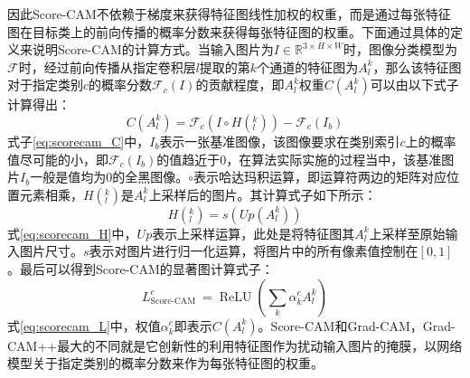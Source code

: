 因此Score-CAM不依赖于梯度来获得特征图线性加权的权重，而是通过每张特征图在目标类上的前向传播的概率分数来获得每张特征图的权重。下面通过具体的定义来说明Score-CAM的计算方式。当输入图片为$I \in \mathbb{R}^{3\times H \times W}$时，图像分类模型为$\mathcal{F}$时，经过前向传播从指定卷积层$l$提取的第$k$个通道的特征图为$A^k_l$，那么该特征图对于指定类别$c$的概率分数$\mathcal{F}_c(I)$的贡献程度，即$A^k_l$权重$C(A^k_l)$可以由以下式子计算得出：
\begin{equation}
	C(A^k_l)=\mathcal{F}_c(I \circ H(^k_l))-\mathcal{F}_c(I_b)
	\label{eq:scorecam_C}
\end{equation}
式子\ref{eq:scorecam_C}中，$I_b$表示一张基准图像，该图像要求在类别索引$c$上的概率值尽可能的小，即$\mathcal{F}_c(I_b)$的值趋近于0，在算法实际实施的过程当中，该基准图片$I_b$一般是值均为0的全黑图像。$\circ$表示哈达玛积运算，即运算符两边的矩阵对应位置元素相乘，$H(^k_l)$是$A^k_l$上采样后的图片。其计算式子如下所示：
\begin{equation}
	H(^k_l)=s(U\!p(A^k_l))
	\label{eq:scorecam_H}
\end{equation}
式\ref{eq:scorecam_H}中，$U\!p$表示上采样运算，此处是将特征图其$A^k_l$上采样至原始输入图片尺寸。$s$表示对图片进行归一化运算，将图片中的所有像素值控制在$[0,1]$。最后可以得到Score-CAM的显著图计算式子：
\begin{equation}
	L_{\text {Score-CAM }}^{c}=\operatorname{ReLU}\left(\sum_{k} \alpha_{k}^{c} A_{l}^{k}\right)
	\label{eq:scorecam_L}
\end{equation}
式\ref{eq:scorecam_L}中，权值$\alpha_{k}^{c}$即表示$C(A^k_l)$。Score-CAM和Grad-CAM，Grad-CAM++最大的不同就是它创新性的利用特征图作为扰动输入图片的掩膜，以网络模型关于指定类别的概率分数来作为每张特征图的权重。


